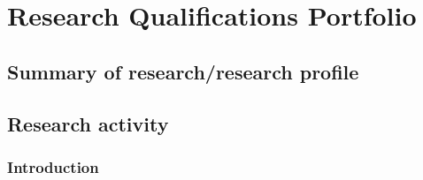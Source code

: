 \chapter{Research Qualifications Portfolio}

\section{Summary of research/research profile} \label{sec:summary-of-research-research-profile}

\section{Research activity} \label{sec:research-activity}


\subsection{Introduction} \label{ssec:introduction}

